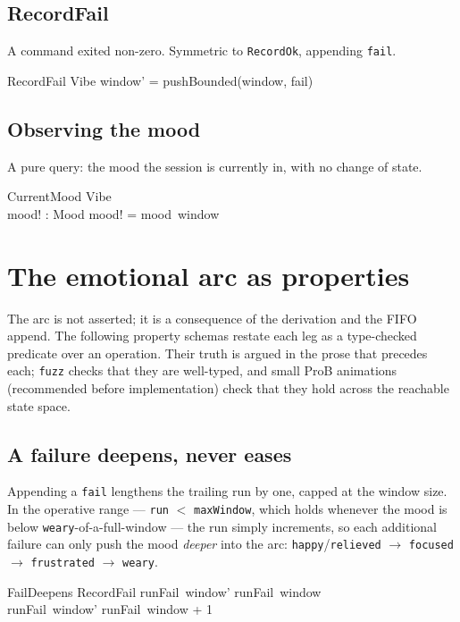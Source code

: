 \documentclass[a4paper,10pt,fleqn]{article}
\begin{document}
\subsection{RecordFail}

A command exited non-zero. Symmetric to \texttt{RecordOk}, appending
\texttt{fail}.

\begin{schema}{RecordFail}
  \Delta Vibe
\where
  window' = pushBounded(window, fail)
\end{schema}

\subsection{Observing the mood}

A pure query: the mood the session is currently in, with no change of state.

\begin{schema}{CurrentMood}
  \Xi Vibe \\
  mood! : Mood
\where
  mood! = mood~window
\end{schema}

\section{The emotional arc as properties}

The arc is not asserted; it is a consequence of the derivation and the FIFO
append. The following property schemas restate each leg as a type-checked
predicate over an operation. Their truth is argued in the prose that precedes
each; \texttt{fuzz} checks that they are well-typed, and small ProB animations
(recommended before implementation) check that they hold across the reachable
state space.

\subsection{A failure deepens, never eases}

Appending a \texttt{fail} lengthens the trailing run by one, capped at the window
size. In the operative range --- \texttt{run} $<$ \texttt{maxWindow}, which holds
whenever the mood is below \texttt{weary}-of-a-full-window --- the run simply
increments, so each additional failure can only push the mood \emph{deeper} into
the arc: \texttt{happy}/\texttt{relieved} $\to$ \texttt{focused} $\to$
\texttt{frustrated} $\to$ \texttt{weary}.

\begin{schema}{FailDeepens}
  RecordFail
\where
  runFail~window' \geq runFail~window \\
  runFail~window' \leq runFail~window + 1
\end{schema}
\end{document}
